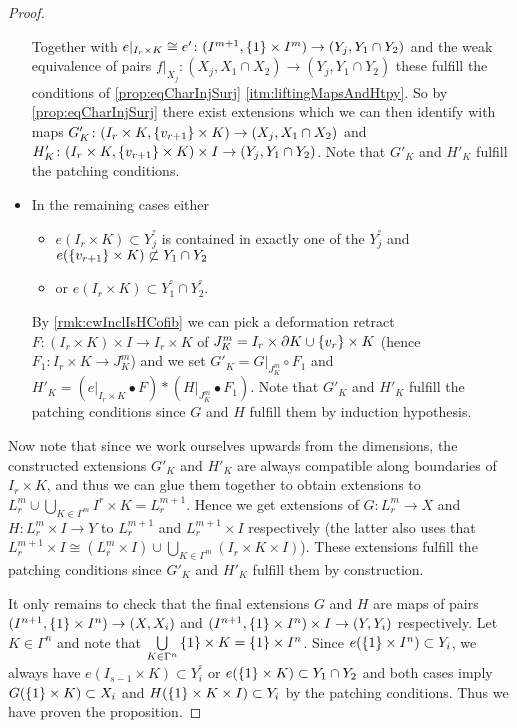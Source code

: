 \begin{prop}
\begin{proof}
\begin{itemize}
                    Together with $e|_{I_r\times K}\cong e'\colon(I^{m+1},\left\lbrace1\right\rbrace\times I^m)\to(Y_j,Y_1\cap Y_2)$ and the weak equivalence of pairs $f|_{X_j}\colon(X_j,X_1\cap X_2)\to(Y_j,Y_1\cap Y_2)$ these fulfill the conditions of \cref{prop:eqCharInjSurj} \ref{itm:liftingMapsAndHtpy}. 
                    So by \cref{prop:eqCharInjSurj} there exist extensions which we can then identify with maps $G'_K\colon(I_r\times K,\left\lbrace v_{r+1}\right\rbrace\times K)\to(X_j,X_1\cap X_2)$ and $H'_K\colon(I_r\times K,\left\lbrace v_{r+1}\right\rbrace\times K)\times I\to(Y_j,Y_1\cap Y_2)$.
                    Note that $G'_K$ and $H'_K$ fulfill the patching conditions.
            \item In the remaining cases either
                    \begin{itemize}
                        \item $e(I_r\times K)\subset Y_j^°$ is contained in exactly one of the $Y_j^°$ and $e(\left\lbrace v_{r+1}\right\rbrace\times K)\not\subset Y_1\cap Y_2$
                        \item or $e(I_r\times K)\subset Y_1^°\cap Y_2^°$.
                    \end{itemize}
                    By \cref{rmk:cwInclIsHCofib} we can pick a deformation retract $F\colon (I_r\times K)\times I\to I_r\times K$ of $J_K^m= I_r\times\partial K\cup\left\lbrace v_r\right\rbrace\times K$ (hence $F_1\colon I_r\times K\to J_K^m$) and we set $G'_K=G|_{J_K^m}\circ F_1$ and $H'_K=(e|_{I_r\times K}\bullet F)*(H|_{J_K^m}\bullet F_1)$.
                    Note that $G'_K$ and $H'_K$ fulfill the patching conditions since $G$ and $H$ fulfill them by induction hypothesis.
        \end{itemize}
        Now note that since we work ourselves upwards from the dimensions, the constructed extensions $G'_K$ and $H'_K$ are always compatible along boundaries of $I_r\times K$, and thus we can glue them together to obtain extensions to $L_r^m\cup\bigcup\limits_{K\in\Gamma^m}I^r\times K=L_r^{m+1}$.
        Hence we get extensions of $G\colon L_r^m\to X$ and $H\colon L_r^m\times I\to Y$ to $L_r^{m+1}$ and $L_r^{m+1}\times I$ respectively (the latter also uses that $L_r^{m+1}\times I\cong\left(L_r^m\times I\right)\cup\bigcup\limits_{K\in\Gamma^m}\left(I_r\times K\times I\right)$).
        These extensions fulfill the patching conditions since $G'_K$ and $H'_K$ fulfill them by construction.

        It only remains to check that the final extensions $G$ and $H$ are maps of pairs $(I^{n+1},\left\lbrace1\right\rbrace\times I^n)\to(X,X_i)$ and $(I^{n+1},\left\lbrace1\right\rbrace\times I^n)\times I\to(Y,Y_i)$ respectively.
        Let $K\in\Gamma^n$ and note that $\bigcup\limits_{K\in\Gamma^n}\left\lbrace1\right\rbrace\times K=\left\lbrace1\right\rbrace\times I^n$.
        Since $e(\left\lbrace1\right\rbrace\times I^n)\subset Y_i$, we always have $e(I_{s-1}\times K)\subset Y_i^°$ or $e(\left\lbrace1\right\rbrace\times K)\subset Y_1\cap Y_2$ and both cases imply $G(\left\lbrace1\right\rbrace\times K)\subset X_i$ and $H(\left\lbrace1\right\rbrace\times K\times I)\subset Y_i$ by the patching conditions.
        Thus we have proven the proposition.
    \end{proof}
\end{prop}
